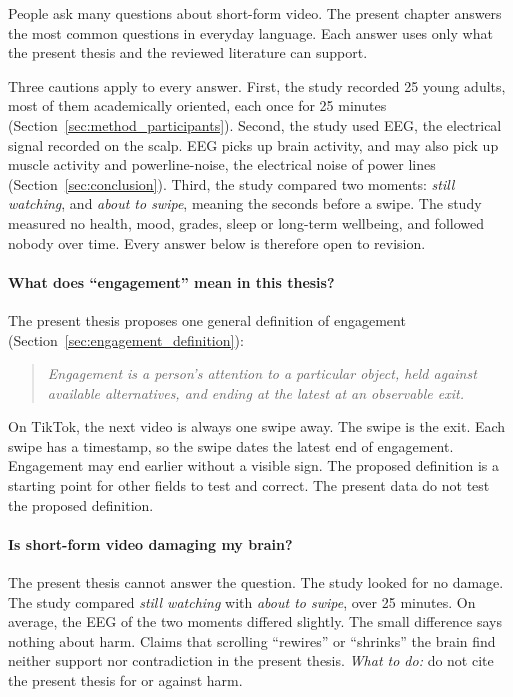 \documentclass[12pt,a4paper]{report}
\begin{document}
People ask many questions about short-form video. The present chapter answers the most common questions in everyday language. Each answer uses only what the present thesis and the reviewed literature can support.

Three cautions apply to every answer. First, the study recorded 25 young adults, most of them academically oriented, each once for 25 minutes (Section~\ref{sec:method_participants}). Second, the study used EEG, the electrical signal recorded on the scalp. EEG picks up brain activity, and may also pick up muscle activity and powerline-noise, the electrical noise of power lines (Section~\ref{sec:conclusion}). Third, the study compared two moments: \emph{still watching}, and \emph{about to swipe}, meaning the seconds before a swipe. The study measured no health, mood, grades, sleep or long-term wellbeing, and followed nobody over time. Every answer below is therefore open to revision.

\paragraph{What does ``engagement'' mean in this thesis?}
The present thesis proposes one general definition of engagement (Section~\ref{sec:engagement_definition}):
\begin{quote}
\emph{Engagement is a person's attention to a particular object, held against available alternatives, and ending at the latest at an observable exit.}
\end{quote}
On TikTok, the next video is always one swipe away. The swipe is the exit. Each swipe has a timestamp, so the swipe dates the latest end of engagement. Engagement may end earlier without a visible sign. The proposed definition is a starting point for other fields to test and correct. The present data do not test the proposed definition.

\paragraph{Is short-form video damaging my brain?}
The present thesis cannot answer the question. The study looked for no damage. The study compared \emph{still watching} with \emph{about to swipe}, over 25 minutes. On average, the EEG of the two moments differed slightly. The small difference says nothing about harm. Claims that scrolling ``rewires'' or ``shrinks'' the brain find neither support nor contradiction in the present thesis.
\emph{What to do:} do not cite the present thesis for or against harm.
\end{document}
